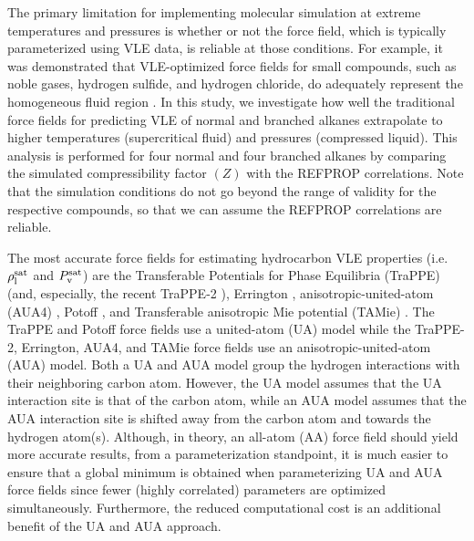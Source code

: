 \documentclass[journal=jctc,manuscript=article]{achemso}
\begin{document}
The primary limitation for implementing molecular simulation at extreme temperatures and pressures is whether or not the force field, which is typically parameterized using VLE data, is reliable at those conditions.  
For example, it was demonstrated that VLE-optimized force fields for small compounds, such as noble gases, hydrogen sulfide, and hydrogen chloride, do adequately represent the homogeneous fluid region \cite{Rutkai2013}. In this study, we investigate how well the traditional force fields for predicting VLE of normal and branched alkanes extrapolate to higher temperatures (supercritical fluid) and pressures (compressed liquid). This analysis is performed for four normal and four branched alkanes by comparing the simulated compressibility factor $(Z)$ with the REFPROP correlations. Note that the simulation conditions do not go beyond the range of validity for the respective compounds, so that we can assume the REFPROP correlations are reliable.

The most accurate force fields for estimating hydrocarbon VLE properties (i.e. $\rho_{\rm l}^{\rm sat}$ and $P_{\rm v}^{\rm sat}$) are the Transferable Potentials for Phase Equilibria (TraPPE) \cite{TraPPE,Martin1999} (and, especially, the recent TraPPE-2 \cite{TraPPEUA2}), Errington \cite{Exp6}, anisotropic-united-atom (AUA4) \cite{AUA4,Bourasseau2002}, Potoff \cite{Mie,Potoff_branched}, and Transferable anisotropic Mie potential (TAMie) \cite{TAMie,Weidler2016}. The TraPPE and Potoff force fields use a united-atom (UA) model while the TraPPE-2, Errington, AUA4, and TAMie force fields use an anisotropic-united-atom (AUA) model. Both a UA and AUA model group the hydrogen interactions with their neighboring carbon atom. However, the UA model assumes that the UA interaction site is that of the carbon atom, while an AUA model assumes that the AUA interaction site is shifted away from the carbon atom and towards the hydrogen atom(s). Although, in theory, an all-atom (AA) force field should yield more accurate results, from a parameterization standpoint, it is much easier to ensure that a global minimum is obtained when parameterizing UA and AUA force fields since fewer (highly correlated) parameters are optimized simultaneously. Furthermore, the reduced computational cost is an additional benefit of the UA and AUA approach.
\end{document}
